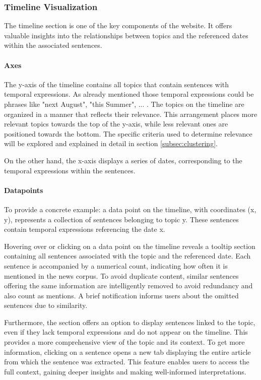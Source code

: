\documentclass[a4paper,10pt]{report}
\begin{document}
\subsubsection{Timeline Visualization}
 The timeline section is one of the key components of the website. It offers valuable insights into the relationships between topics and the referenced dates within the associated sentences.

\paragraph{Axes}
The y-axis of the timeline contains all topics that contain sentences with temporal expressions. As already mentioned those temporal expressions could be phrases like "next August", "this Summer", ... . The topics on the timeline are organized in a manner that reflects their relevance. This arrangement places more relevant topics towards the top of the y-axis, while less relevant ones are positioned towards the bottom. The specific criteria used to determine relevance will be explored and explained in detail in section \ref{subsec:clustering}.

On the other hand, the x-axis displays a series of dates, corresponding to the temporal expressions within the sentences.

\paragraph{Datapoints}
To provide a concrete example: a data point on the timeline, with coordinates (x, y), represents a collection of sentences belonging to topic y. These sentences contain temporal expressions referencing the date x.

Hovering over or clicking on a data point on the timeline reveals a tooltip section containing all sentences associated with the topic and the referenced date. Each sentence is accompanied by a numerical count, indicating how often it is mentioned in the news corpus. To avoid duplicate content, similar sentences offering the same information are intelligently removed to avoid redundancy and also count as mentions. A brief notification informs users about the omitted sentences due to similarity.

Furthermore, the section offers an option to display sentences linked to the topic, even if they lack temporal expressions and do not appear on the timeline. This provides a more comprehensive view of the topic and its context. To get more information, clicking on a sentence opens a new tab displaying the entire article from which the sentence was extracted. This feature enables users to access the full context, gaining deeper insights and making well-informed interpretations.
\end{document}
